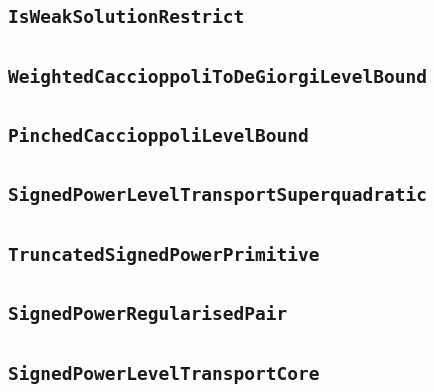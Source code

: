 \documentclass[11pt]{amsart}
\theoremstyle{definition}
\begin{document}
\subsection{\texorpdfstring{\texttt{IsWeakSolutionRestrict}}{IsWeakSolutionRestrict}}\label{node:IsWeakSolutionRestrict}


\subsection{\texorpdfstring{\texttt{WeightedCaccioppoliToDeGiorgiLevelBound}}{WeightedCaccioppoliToDeGiorgiLevelBound}}\label{node:WeightedCaccioppoliToDeGiorgiLevelBound}


\subsection{\texorpdfstring{\texttt{PinchedCaccioppoliLevelBound}}{PinchedCaccioppoliLevelBound}}\label{node:PinchedCaccioppoliLevelBound}


\subsection{\texorpdfstring{\texttt{SignedPowerLevelTransportSuperquadratic}}{SignedPowerLevelTransportSuperquadratic}}\label{node:SignedPowerLevelTransportSuperquadratic}


\subsection{\texorpdfstring{\texttt{TruncatedSignedPowerPrimitive}}{TruncatedSignedPowerPrimitive}}\label{node:TruncatedSignedPowerPrimitive}


\subsection{\texorpdfstring{\texttt{SignedPowerRegularisedPair}}{SignedPowerRegularisedPair}}\label{node:SignedPowerRegularisedPair}


\subsection{\texorpdfstring{\texttt{SignedPowerLevelTransportCore}}{SignedPowerLevelTransportCore}}\label{node:SignedPowerLevelTransportCore}

\end{document}
